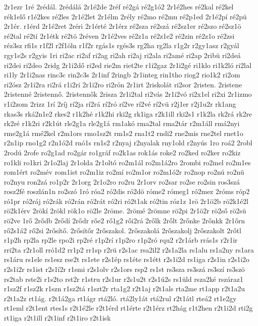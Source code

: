 {2r1ezr
1ré
2rédál.
2rédálá
2r1é2de
2réf
ré2gá
ré2g1ó2
2r1é2hes
ré2kal
ré2kel
rék1elő
r1é2kes
ré2les
2r1é2let
2r1élm
2rély
ré2mo
ré2mu
ré2p1ed
2r1é2pí
ré2pü
2r1ér.
r1érd
2r1é2ret
2réri
2r1érté
2r1érz
ré2sza
ré2szá
ré2sz1er
ré2szo
ré2sz1ö
ré2tal
ré2tí
2r1étk
ré2tö
2réven
2r1é2ves
ré2z1a
ré2z1e2
ré2zin
ré2z1o
ré2zsi
réz3sz
rfi1s
r1f2l
r2f1öln
r1f2r
rgás1s
rgés3s
rg2ha
rg2la
r1g2r
r2gy1asz
r2gyál
rgy1e2s
r2gyis
1ri
ri2ac
ri2af
ri2ag
ri2ah
ri2aj
ri2ala
ri2amé
ri2ap
2ribü
ri2deá
ri2dei
ri2deo
2ridg
2r1i2dő
ri2ed
rie2m
riet2te
r1i2gaz
2r1i2gé
ri1klo
ri1k2ló
ri2lal
ri1ly
2r1i2nas
rinc3c
rin2c3s
2r1inf
2ringb
2r1integ
rin1tho
riog2
rio1k2
ri2om
ri2ósz
2r1i2ra
ri2rá
r1i2ri
2r1i2ro
ri2rón
2r1irt
2riskolát
ri2sor
2risten.
2ristene
2ristenné
2ristennő.
2ristennők
2risza
2r1i2tal
ri2vás
2r1i2vó
ri2x1el
ri2xi
2r1izmo
r1i2zom
2rizz
1rí
2ríj
rí2ja
rí2rá
rí2ró
rí2ve
rí2vé
rí2vü
r2j1er
r2j1u2r
rk1ang
rkas3s
rká2n1e2
rkes2
r1k2hé
r1k2hi
rki2g
rk1iga
r2k1ill
rki2s1
r1k2la
rk2rá
rk2re
rk2ré
r1k2ri
r2k1út
rle2g1a
rle2g1á
rm1akó
rma2tal
rma2tár
r2m1áll
rmá2nyi
rme2g1á
rmé2kel
r2m1ors
rmo1sz2t
rm1s2
rna1t2
rndi2
rne2mis
rne2tel
rnet1o
r2n1ip
rno1g2
r2n1ó2d
rnó1s
rn1s2
r2nyaj
r2nyalak
rny1old
r2nyús
1ro
roá2
2robl
2rodú
2rofe
ro2g1ad
ro2gár
ro1gráf
ro2k1as
rok1ás
roke2
ro2ked
ro2ker
ro2kiz
ro1kli
ro1kri
2r1o2laj
2r1olda
2r1oltó
ro2m1ál
ro2m1á2ro
2rombi
ro2mel
ro2m1es
rom1ért
ro2mév
rom1ist
ro2m1iz
ro2mí
ro2m1or
ro2m1ó2r
ro2nop
ro2nú
ro2nü
ro2nyu
ron2zá
ro1p2r
2r1org
2r1o2ro
ro2ru
2r1orv
ro2sar
ro2se
ro2sin
ros3szá
rosz2fé
roszlán1n
ro2szó
1ró
róa2
ró2dis
ró2dö
róme2
rómeg1
ró2mez
2róms
róp2
ró1pr
ró2ráj
ró2rák
ró2rán
ró2rát
ró2ri
ró2t1ak
ró2tin
róz1z
1rö
2r1ö2b
rö2k1é2l
rö2k1érv
2rökí
2rökl
rök1o
rö2le
2röme.
2römé
2römne
rö2pi
2r1ö2r
rö2ső
rö2sü
rö2ve
1rő
2rődb
2rődí
2rődr
rőe2
rő1g2
rői2rá
2rőlk
2rőlt
2rőnke
2rőnkk
2r1őrn
rő2s1á2
rő2si
2rősítő.
2rősítőr
2rőszakol.
2rőszakolá
2rőszakolj
2rőszakolt
2rőtl
r1p2h
rp2la
rp2le
rpo2i
rp2ré
r1p2rí
r1p2ro
r1p2ró
rqu2
r2r1árb
rrás1s
r2r1ir
rri2ta
r2r1oll
rró1d2
rr1p2
rr1sp
r2rü
r2s1ac
rsa2il2
r2s1a2la
rs1alu
rs1a2ny
rs1ara
rs1áru
rs1ele
rs1esz
rse2t
rs1ete
r2s1ép
rs1éte
rs1étt
r2s1i2d
rs1iga
r2s1in
r2s1i2o
r2s1i2r
rs1ist
r2s1í2r
r1smi
r2s1olv
r2s1ors
rsp2
rs1st
rs3sza
rs3szá
rs3szí
rs3szö
rs2tab
rste2i
r1s2to
rst2r
r1stru
r2s1ur
r2s1u2t
r2s1ú2s
rs1üld
rsza2ké
rszáraz1
r1sz2f
r1sz2k
r1szn
r1sz2tá
r1szt2r
rta1g2
r2t1aj
r2t1als
rta2me
rt1app
r2t1a2u
r2t1a2z
rt1ág.
r2t1á2ga
rt1ágr
rtá2ló.
rtá2ly1át
rtá2rul
r2t1átl
rteá2
rt1e2gy
rt1eml
r2t1ent
rtes1s
r2t1é2le
r2t1érd
rt1érte
r2t1érz
rt2hág
r1t2hen
r2t1i2d
rti2g
rt1iga
r2t1ill
r2t1inf
r2t1iro
r2t1isk
}
